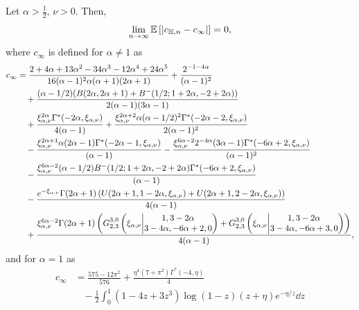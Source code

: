 \begin{theorem} \label{thm:clustering_coefficient_hyperbolic}
Let $\alpha > \frac{1}{2}$, $\nu > 0$. Then,
\[
	\lim_{n \to \infty} \Exp{\left|c_{\H,n} - c_\infty\right|} = 0,
\]
where $c_\infty$ is defined for $\alpha \ne 1$ as
\begin{align*}
	c_\infty 
	&=\frac{2 + 4 \alpha + 13 \alpha^2 - 34 \alpha^3 - 12\alpha^4 + 24 \alpha^5}
		{16(\alpha-1)^2 \alpha (\alpha+1) (2\alpha+1)} 
		+  \frac{2^{-1 - 4 \alpha}}{(\alpha - 1)^2} \\
	&\hspace{10pt}+ \frac{(\alpha - 1/2) (B(2 \alpha, 2 \alpha + 1) + B^-(1/2; 1 + 2 \alpha, -2 + 2 \alpha))}
		{2 (\alpha - 1) (3 \alpha - 1)} \\
	&\hspace{10pt}+ \frac{\xi_{\alpha,\nu}^{2\alpha} \Gamma^\ast( - 2 \alpha, \xi_{\alpha,\nu})}{4(\alpha-1)}
		+ \frac{\xi_{\alpha,\nu}^{2\alpha + 2}\alpha (\alpha - 1/2)^2 \Gamma^\ast(- 2 \alpha - 2, \xi_{\alpha,\nu})}
		{2(\alpha-1)^2} \\
	&\hspace{10pt}- \frac{\xi_{\alpha,\nu}^{2\alpha + 1}\alpha (2\alpha - 1) \Gamma^\ast( - 2 \alpha - 1,\xi_{\alpha,\nu})}{(\alpha-1)}
		- \frac{\xi_{\alpha,\nu}^{6\alpha-2}2^{-4\alpha}(3\alpha - 1)\Gamma^\ast( - 6 \alpha + 2, \xi_{\alpha,\nu})}{(\alpha-1)^2}\\
	&\hspace{10pt}-\frac{\xi_{\alpha,\nu}^{6\alpha - 2}(\alpha - 1/2) B^-(1/2; 1 + 2 \alpha, -2 + 2 \alpha)\Gamma^\ast( - 6 \alpha + 2, \xi_{\alpha,\nu})}{(\alpha-1)} \\
	&\hspace{10pt}- \frac{e^{-\xi_{\alpha,\nu}} \Gamma(2\alpha+1) 
		\left(U(2\alpha+1,1-2\alpha,\xi_{\alpha,\nu}) + U(2\alpha+1,2-2\alpha,\xi_{\alpha,\nu})\right)}{4(\alpha-1)} \\
	&\hspace{10pt}+ \frac{\xi_{\alpha,\nu}^{6\alpha - 2} \Gamma(2\alpha+1)\left( 	
		\MeijerGnew{3}{0}{2}{3}{1,3-2\alpha}{3-4\alpha,-6\alpha+2,0}{\xi_{\alpha,\nu}}
		+ \MeijerGnew{3}{0}{2}{3}{1,3-2\alpha}{3-4\alpha,-6\alpha+3,0}{\xi_{\alpha,\nu}}\right)}{4(\alpha-1)},
\end{align*}
and for $\alpha = 1$ as
\begin{align*}
	c_\infty &= \frac{575 - 12 \pi^2}{576} + \frac{\eta^4(7 + \pi^2)\Gamma^\ast(-4, \eta)}{4}\\
	&\hspace{10pt}- \frac{1}{2} \int_0^1 (1 - 4z + 3z^3)\log(1-z)(z + \eta)e^{-\eta/z} \dd z\\

\end{align*}
\end{theorem}
